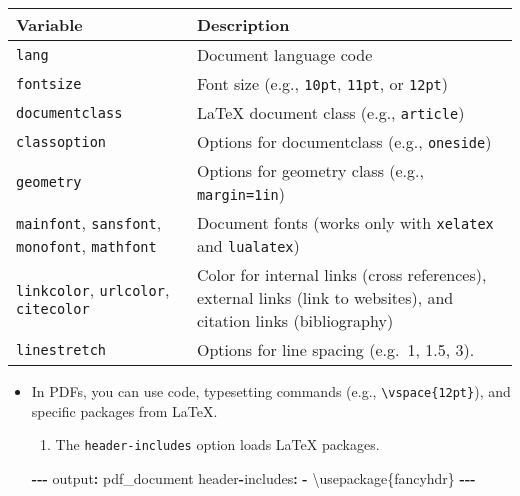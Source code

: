 \documentclass[
]{book}
\newenvironment{Shaded}{\begin{snugshade}}{\end{snugshade}}
\newcommand{\NormalTok}[1]{#1}
\newcommand{\SpecialCharTok}[1]{\textcolor[rgb]{0.81,0.36,0.00}{\textbf{#1}}}
\providecommand{\tightlist}{%
  \setlength{\itemsep}{0pt}\setlength{\parskip}{0pt}}
\begin{document}
\begin{itemize}
  \begin{longtable}[]{@{}
    >{\raggedright\arraybackslash}p{}
    >{\raggedright\arraybackslash}p{}@{}}
  \toprule\noalign{}
  \begin{minipage}[b]{\linewidth}\raggedright
  Variable
  \end{minipage} & \begin{minipage}[b]{\linewidth}\raggedright
  Description
  \end{minipage} \\
  \midrule\noalign{}
  \endhead
  \bottomrule\noalign{}
  \endlastfoot
  \texttt{lang} & Document language code \\
  \texttt{fontsize} & Font size (e.g., \texttt{10pt}, \texttt{11pt}, or \texttt{12pt}) \\
  \texttt{documentclass} & LaTeX document class (e.g., \texttt{article}) \\
  \texttt{classoption} & Options for documentclass (e.g., \texttt{oneside}) \\
  \texttt{geometry} & Options for geometry class (e.g., \texttt{margin=1in}) \\
  \texttt{mainfont}, \texttt{sansfont}, \texttt{monofont}, \texttt{mathfont} & Document fonts (works only with \texttt{xelatex} and \texttt{lualatex}) \\
  \texttt{linkcolor}, \texttt{urlcolor}, \texttt{citecolor} & Color for internal links (cross references), external links (link to websites), and citation links (bibliography) \\
  \texttt{linestretch} & Options for line spacing (e.g.~1, 1.5, 3). \\
  \end{longtable}

  \begin{itemize}
  \item
    In PDFs, you can use code, typesetting commands (e.g., \texttt{\textbackslash{}vspace\{12pt\}}), and specific packages from LaTeX.

    \begin{enumerate}
    \def\labelenumi{\arabic{enumi}.}
    \tightlist
    \item
      The \texttt{header-includes} option loads LaTeX packages.
    \end{enumerate}

\begin{Shaded}
\begin{Highlighting}[]
\SpecialCharTok{{-}{-}{-}}
\NormalTok{output}\SpecialCharTok{:}\NormalTok{ pdf\_document}
\NormalTok{header}\SpecialCharTok{{-}}\NormalTok{includes}\SpecialCharTok{:}
\SpecialCharTok{{-}}\NormalTok{ \textbackslash{}usepackage\{fancyhdr\}}
\SpecialCharTok{{-}{-}{-}}


\end{Highlighting}
\end{Shaded}
\end{itemize}
\end{itemize}
\end{document}
